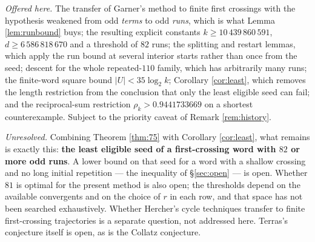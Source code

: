 \documentclass[11pt,a4paper]{article}
\theoremstyle{plain}\newtheorem{theorem}{Theorem}\newtheorem{proposition}[theorem]{Proposition}
\theoremstyle{definition}\newtheorem{example}[theorem]{Example}
\theoremstyle{remark}\newtheorem{remark}[theorem]{Remark}
\begin{document}
\emph{Offered here.} The transfer of Garner's method to finite first crossings with the
hypothesis weakened from odd \emph{terms} to odd \emph{runs}, which is what
Lemma \ref{lem:runbound} buys; the resulting explicit constants
$k\ge10\,439\,860\,591$, $d\ge6\,586\,818\,670$ and a threshold of $82$ runs; the splitting
and restart lemmas, which apply the run bound at several interior starts rather than once from
the seed; descent for the whole repeated-$110$ family, which has arbitrarily many runs; the
finite-word square bound $|U|<35\log_2k$; Corollary \ref{cor:least}, which removes the
length restriction from the conclusion that only the least eligible seed can fail; and the
reciprocal-sum restriction $\rho_k>0.9441733669$ on a shortest counterexample. Subject to the
priority caveat of Remark \ref{rem:history}.

\emph{Unresolved.} Combining Theorem \ref{thm:75} with Corollary \ref{cor:least}, what
remains is exactly this: \textbf{the least eligible seed of a first-crossing word with $82$ or
more odd runs}. A lower bound on that seed for a word with a shallow crossing and no long
initial repetition --- the inequality of \S\ref{sec:open} --- is open. Whether $81$ is optimal
for the present method is also open; the thresholds depend on the available convergents and on
the choice of $r$ in each row, and that space has not been searched exhaustively. Whether
Hercher's cycle techniques transfer to finite first-crossing trajectories is a separate
question, not addressed here. Terras's conjecture itself is open, as is the Collatz conjecture.
\end{document}
